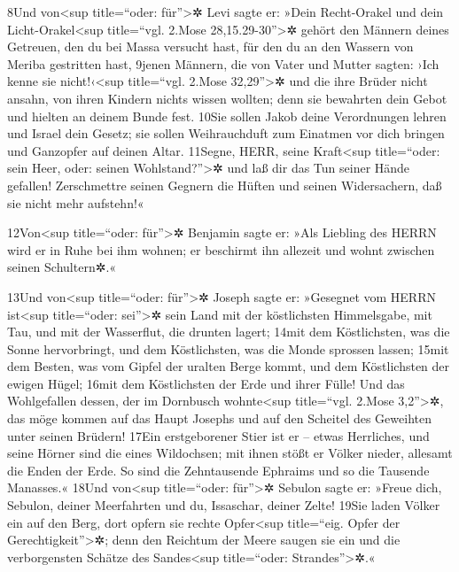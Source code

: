 8Und von\textless sup title=``oder: für''\textgreater✲ Levi sagte er:
»Dein Recht-Orakel und dein Licht-Orakel\textless sup title=``vgl.
2.Mose 28,15.29-30''\textgreater✲ gehört den Männern deines Getreuen,
den du bei Massa versucht hast, für den du an den Wassern von Meriba
gestritten hast, 9jenen Männern, die von Vater und Mutter sagten: ›Ich
kenne sie nicht!‹\textless sup title=``vgl. 2.Mose 32,29''\textgreater✲
und die ihre Brüder nicht ansahn, von ihren Kindern nichts wissen
wollten; denn sie bewahrten dein Gebot und hielten an deinem Bunde fest.
10Sie sollen Jakob deine Verordnungen lehren und Israel dein Gesetz; sie
sollen Weihrauchduft zum Einatmen vor dich bringen und Ganzopfer auf
deinen Altar. 11Segne, HERR, seine Kraft\textless sup title=``oder: sein
Heer, oder: seinen Wohlstand?''\textgreater✲ und laß dir das Tun seiner
Hände gefallen! Zerschmettre seinen Gegnern die Hüften und seinen
Widersachern, daß sie nicht mehr aufstehn!«

12Von\textless sup title=``oder: für''\textgreater✲ Benjamin sagte er:
»Als Liebling des HERRN wird er in Ruhe bei ihm wohnen; er beschirmt ihn
allezeit und wohnt zwischen seinen Schultern✲.«

13Und von\textless sup title=``oder: für''\textgreater✲ Joseph sagte er:
»Gesegnet vom HERRN ist\textless sup title=``oder: sei''\textgreater✲
sein Land mit der köstlichsten Himmelsgabe, mit Tau, und mit der
Wasserflut, die drunten lagert; 14mit dem Köstlichsten, was die Sonne
hervorbringt, und dem Köstlichsten, was die Monde sprossen lassen; 15mit
dem Besten, was vom Gipfel der uralten Berge kommt, und dem Köstlichsten
der ewigen Hügel; 16mit dem Köstlichsten der Erde und ihrer Fülle! Und
das Wohlgefallen dessen, der im Dornbusch wohnte\textless sup
title=``vgl. 2.Mose 3,2''\textgreater✲, das möge kommen auf das Haupt
Josephs und auf den Scheitel des Geweihten unter seinen Brüdern! 17Ein
erstgeborener Stier ist er -- etwas Herrliches, und seine Hörner sind
die eines Wildochsen; mit ihnen stößt er Völker nieder, allesamt die
Enden der Erde. So sind die Zehntausende Ephraims und so die Tausende
Manasses.« 18Und von\textless sup title=``oder: für''\textgreater✲
Sebulon sagte er: »Freue dich, Sebulon, deiner Meerfahrten und du,
Issaschar, deiner Zelte! 19Sie laden Völker ein auf den Berg, dort
opfern sie rechte Opfer\textless sup title=``eig. Opfer der
Gerechtigkeit''\textgreater✲; denn den Reichtum der Meere saugen sie ein
und die verborgensten Schätze des Sandes\textless sup title=``oder:
Strandes''\textgreater✲.«

